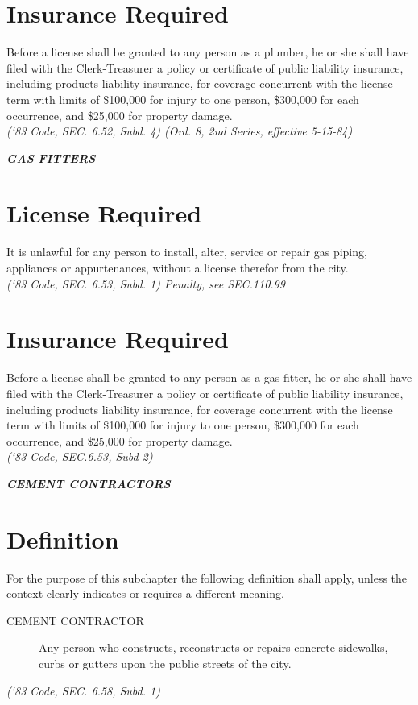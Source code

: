 \section{Insurance Required}
Before a license shall be granted to any person as a plumber, he or she shall have filed with the Clerk-Treasurer a policy or certificate of public liability insurance, including products liability insurance, for coverage concurrent with the license term with limits of \$100,000 for injury to one person, \$300,000 for each occurrence, and \$25,000 for property damage.\\
\emph{(‘83 Code, SEC. 6.52, Subd. 4)  (Ord. 8, 2nd Series, effective 5-15-84)}

\begin{center}
    \emph{\textbf{\LARGE{GAS FITTERS}}}
\end{center}

\setcounter{section}{14}
\section{License Required}
It is unlawful for any person to install, alter, service or repair gas piping, appliances or appurtenances, without a license therefor from the city.\\
\emph{(‘83 Code, SEC. 6.53, Subd. 1) Penalty, see SEC.110.99}
\section{Insurance Required}
Before a license shall be granted to any person as a gas fitter, he or she shall have filed with the Clerk-Treasurer a policy or certificate of public liability insurance, including products liability insurance, for coverage concurrent with the license term with limits of \$100,000 for injury to one person, \$300,000 for each occurrence, and \$25,000 for property damage.\\
\emph{(‘83 Code, SEC.6.53, Subd 2)}

\begin{center}
    \emph{\textbf{\LARGE{CEMENT CONTRACTORS}}}
\end{center}

\setcounter{section}{29}
\section{Definition}
For the purpose of this subchapter the following definition shall apply, unless the context clearly indicates or requires a different meaning.
\begin{description}
    \item[CEMENT CONTRACTOR] Any person who constructs, reconstructs or repairs concrete sidewalks, curbs or gutters upon the public streets of the city.
\end{description}
\emph{(‘83 Code, SEC. 6.58, Subd. 1)}
